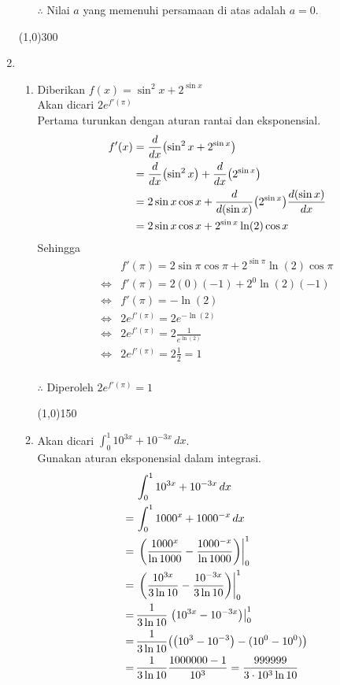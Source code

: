 \begin{enumerate}[leftmargin=*, label={\arabic*}.]
\begin{enumerate}[label={\alph*}.]
    $\therefore$ Nilai $a$ yang memenuhi persamaan di atas adalah $a=0$.
\end{enumerate}
\begin{center}
    \line(1,0){300}
\end{center}
\item 
\begin{enumerate}[label={\alph*}.]
    \item Diberikan $f(x)=\sin^{2}x+2^{\sin x}$\\
    Akan dicari $2e^{f'(\pi)}$\\
    Pertama turunkan dengan aturan rantai dan eksponensial.
    \begin{align*}
        f'(x) &= \drv{x}{\sin^{2}x+2^{\sin x}}\\
        &= \drv{x}{\sin^{2}x}+\drv{x}{2^{\sin x}}\\
        &= 2\sin x\cos x+\drv{(\sin x)}{2^{\sin x}}\frac{d(\sin x)}{dx}\\
        &= 2\sin x\cos x+2^{\sin x}\ln(2)\cos x
    \end{align*}
    Sehingga 
    \begin{align*}
        &f'(\pi) = 2\sin \pi\cos \pi+2^{\sin \pi}\ln(2)\cos \pi\\
        \iff &f'(\pi) = 2(0)(-1)+2^{0}\ln(2)(-1)\\
        \iff &f'(\pi) = -\ln(2)\\
        \iff &2e^{f'(\pi)} = 2e^{-\ln(2)}\\
        \iff &2e^{f'(\pi)} = 2\frac{1}{e^{\ln(2)}}\\
        \iff &2e^{f'(\pi)} = 2\frac{1}{2} = 1\\
    \end{align*}

    $\therefore$ Diperoleh $2e^{f'(\pi)} = 1$
\begin{center}
    \line(1,0){150}
\end{center}
    \item Akan dicari $\int_{0}^{1} 10^{3x}+10^{-3x}\,dx$.\\
    Gunakan aturan eksponensial dalam integrasi.
    \begin{align*}
        &\int_{0}^{1} 10^{3x}+10^{-3x}\,dx\\
        =\,&\int_{0}^{1} 1000^{x}+1000^{-x}\,dx\\
        =\,&\eval{\frac{1000^{x}}{\ln 1000}-\frac{1000^{-x}}{\ln 1000}}{0}{1}\\
        =\,&\eval{\frac{10^{3x}}{3\ln 10}-\frac{10^{-3x}}{3\ln 10}}{0}{1}\\
        =\,&\frac{1}{3\ln 10}\eval{10^{3x}-10^{-3x}}{0}{1}\\
        =\,&\frac{1}{3\ln 10}\brk*{\brk*{10^{3}-10^{-3}}-(10^{0}-10^{0})}\\
        =\,&\frac{1}{3\ln 10}\frac{1000000-1}{10^{3}} = \frac{999999}{3\cdot10^{3}\ln10}
    \end{align*}


\end{enumerate}
\end{enumerate}
